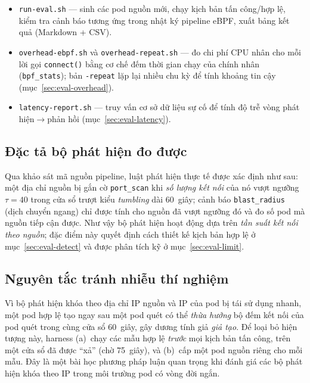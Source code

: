 \begin{itemize}[leftmargin=1.4em]
  \item \texttt{run-eval.sh} --- sinh các pod nguồn mới, chạy kịch bản tấn
        công/hợp lệ, kiểm tra cảnh báo tương ứng trong nhật ký pipeline eBPF,
        xuất bảng kết quả (Markdown + CSV).
  \item \texttt{overhead-ebpf.sh} và \texttt{overhead-repeat.sh} --- đo chi phí
        CPU nhân cho mỗi lời gọi \texttt{connect()} bằng cơ chế đếm thời gian
        chạy của chính nhân (\texttt{bpf\_stats}); bản \texttt{-repeat} lặp lại
        nhiều chu kỳ để tính khoảng tin cậy (mục~\ref{sec:eval-overhead}).
  \item \texttt{latency-report.sh} --- truy vấn cơ sở dữ liệu sự cố để tính độ
        trễ vòng phát hiện$\rightarrow$phản hồi (mục~\ref{sec:eval-latency}).
\end{itemize}

\subsection{Đặc tả bộ phát hiện đo được}

Qua khảo sát mã nguồn pipeline, luật phát hiện thực tế được xác định như sau:
một địa chỉ nguồn bị gắn cờ \texttt{port\_scan} khi \emph{số lượng kết nối} của
nó vượt ngưỡng $\tau = 40$ trong cửa sổ trượt kiểu \emph{tumbling} dài $60$~giây;
cảnh báo \texttt{blast\_radius} (dịch chuyển ngang) chỉ được tính cho nguồn đã
vượt ngưỡng đó và đo số pod mà nguồn tiếp cận được. Như vậy bộ phát hiện hoạt
động dựa trên \emph{tần suất kết nối theo nguồn}; đặc điểm này quyết định cách
thiết kế kịch bản hợp lệ ở mục~\ref{sec:eval-detect} và được phân tích kỹ ở
mục~\ref{sec:eval-limit}.

\subsection{Nguyên tắc tránh nhiễu thí nghiệm}

Vì bộ phát hiện khóa theo địa chỉ IP nguồn và IP của pod bị tái sử dụng nhanh,
một pod hợp lệ tạo ngay sau một pod quét có thể \emph{thừa hưởng} bộ đếm kết nối
của pod quét trong cùng cửa sổ 60~giây, gây dương tính giả \emph{giả tạo}. Để
loại bỏ hiện tượng này, harness (a)~chạy các mẫu hợp lệ \emph{trước} mọi kịch bản
tấn công, trên một cửa sổ đã được ``xả'' (chờ 75~giây), và (b)~cấp một pod nguồn
riêng cho mỗi mẫu. Đây là một bài học phương pháp luận quan trọng khi đánh giá
các bộ phát hiện khóa theo IP trong môi trường pod có vòng đời ngắn.

